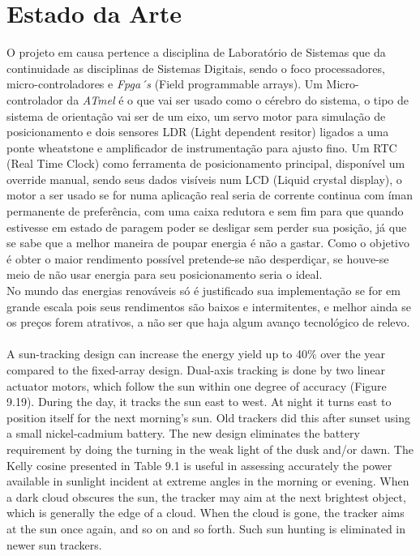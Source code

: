 \section{Estado da Arte}
\qquad O projeto em causa pertence a disciplina de Laboratório de Sistemas que da continuidade as disciplinas de Sistemas Digitais, sendo o foco processadores, micro-controladores e {\it Fpga´s} (Field programmable arrays). Um Micro-controlador da {\it ATmel} é o que vai ser usado como o cérebro do sistema, o tipo de sistema de orientação vai ser de um eixo, um servo motor para simulação de posicionamento e dois sensores LDR (Light dependent resitor) ligados a uma ponte wheatstone e amplificador de instrumentação para ajusto fino. Um RTC (Real Time Clock) como ferramenta de posicionamento principal, disponível um override manual, sendo seus dados visíveis num LCD (Liquid crystal display), o motor a ser usado se for numa aplicação real seria de corrente continua com íman permanente \cite{book_1} de preferência, com uma caixa redutora e sem fim para que quando estivesse em estado de paragem poder se desligar sem perder sua posição, já que se sabe que a melhor maneira de poupar energia é não a gastar. Como o objetivo é obter o maior rendimento possível pretende-se não desperdiçar, se houve-se meio de não usar energia para seu posicionamento seria o ideal.\\
No mundo das energias renováveis só é justificado sua implementação se for em grande escala pois seus rendimentos são baixos e intermitentes, e melhor ainda se os preços forem atrativos, a não ser que haja algum avanço tecnológico de relevo.\\
\\


A sun-tracking design can increase the energy yield up to 40\% over the year compared to the fixed-array design. Dual-axis tracking is done by two linear actuator motors, which follow the sun within one degree of accuracy (Figure 9.19). During the day, it tracks the sun east to west. At night it turns east to position itself for the next morning’s sun. Old trackers did this after sunset using a small nickel-cadmium battery. The new design eliminates the battery requirement by doing the turning in the weak light of the dusk and/or dawn. The Kelly cosine presented in Table 9.1 is useful in assessing accurately the power available in sunlight incident at extreme angles in the morning or evening. When a dark cloud obscures the sun, the tracker may aim at the next brightest object, which is generally the edge of a cloud. When the cloud is gone, the tracker aims at the sun once again, and so on and so forth. Such sun hunting is eliminated in newer sun trackers. \cite{book_2}\\

